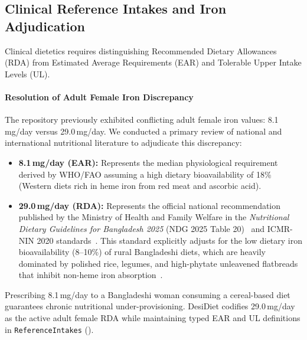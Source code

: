 \documentclass[5p,times,twocolumn]{elsarticle}
\makeatletter
\def\systemname{DesiDiet}%
\def\my@bx{bx}
\def\my@b{b}
\DeclareRobustCommand{\systemname}{%
  \texorpdfstring{%
    \ifx\f@series\my@bx
      DesiDiet%
    \else\ifx\f@series\my@b
      DesiDiet%
    \else
      \textsc{DesiDiet}%
    \fi\fi
  }{DesiDiet}%
}
\makeatother
\begin{document}
\subsection{Clinical Reference Intakes and Iron Adjudication}
Clinical dietetics requires distinguishing Recommended Dietary Allowances (RDA) from Estimated Average Requirements (EAR) and Tolerable Upper Intake Levels (UL).

\paragraph{Resolution of Adult Female Iron Discrepancy}
The repository previously exhibited conflicting adult female iron values: 8.1\,mg/day versus 29.0\,mg/day. We conducted a primary review of national and international nutritional literature to adjudicate this discrepancy:
\begin{itemize}[leftmargin=*,itemsep=1.5pt]
  \item \textbf{8.1\,mg/day (EAR):} Represents the median physiological requirement derived by WHO/FAO assuming a high dietary bioavailability of 18\% (Western diets rich in heme iron from red meat and ascorbic acid).
  \item \textbf{29.0\,mg/day (RDA):} Represents the official national recommendation published by the Ministry of Health and Family Welfare in the \textit{Nutritional Dietary Guidelines for Bangladesh 2025} (NDG 2025 Table 20)~\cite{bdnac2023} and ICMR-NIN 2020 standards~\cite{icmr2020rda}. This standard explicitly adjusts for the low dietary iron bioavailability (8--10\%) of rural Bangladeshi diets, which are heavily dominated by polished rice, legumes, and high-phytate unleavened flatbreads that inhibit non-heme iron absorption~\cite{hurrell2010iron}.
\end{itemize}
Prescribing 8.1\,mg/day to a Bangladeshi woman consuming a cereal-based diet guarantees chronic nutritional under-provisioning. \systemname{} codifies 29.0\,mg/day as the active adult female RDA while maintaining typed EAR and UL definitions in \texttt{ReferenceIntakes} ().
\end{document}
